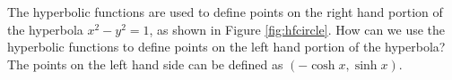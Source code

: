 {The hyperbolic functions are used to define points on the right hand portion of the hyperbola $x^2-y^2=1$, as shown in Figure \ref{fig:hfcircle}. How can we use the hyperbolic functions to define points on the left hand portion of the hyperbola?}
{The points on the left hand side can be defined as $(-\cosh x, \sinh x)$.}

